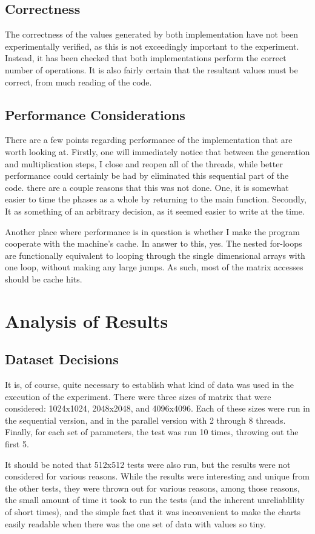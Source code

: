 \documentclass[11pt]{article}
\begin{document}
\subsection{Correctness}
The correctness of the values generated by both implementation have not been
experimentally verified, as this is not exceedingly important to the
experiment. Instead, it has been checked that both implementations perform the
correct number of operations. It is also fairly certain that the resultant
values must be correct, from much reading of the code.
\subsection{Performance Considerations}
There are a few points regarding performance of the implementation that are
worth looking at. Firstly, one will immediately notice that between the
generation and multiplication steps, I close and reopen all of the threads,
while better performance could certainly be had by eliminated this sequential
part of the code. there are a couple reasons that this was not done. One, it is
somewhat easier to time the phases as a whole by returning to the main
function. Secondly, It as something of an arbitrary decision, as it seemed
easier to write at the time.

Another place where performance is in question is whether I make the program
cooperate with the machine's cache. In answer to this, yes. The nested
for-loops are functionally equivalent to looping through the single dimensional
arrays with one loop, without making any large jumps. As such, most of the
matrix accesses should be cache hits.
\section{Analysis of Results}
\subsection{Dataset Decisions}
It is, of course, quite necessary to establish what kind of data was used in
the execution of the experiment. There were three sizes of matrix that were
considered: 1024x1024, 2048x2048, and 4096x4096. Each of these sizes were run
in the sequential version, and in the parallel version with 2 through 8
threads. Finally, for each set of parameters, the test was run 10 times,
throwing out the first 5.

It should be noted that 512x512 tests were also run, but the results were not
considered for various reasons. While the results were interesting and unique
from the other tests, they were thrown out for various reasons, among those
reasons, the small amount of time it took to run the tests (and the inherent
unreliablility of short times), and the simple fact that it was inconvenient to
make the charts easily readable when there was the one set of data with values
so tiny.
\end{document}
